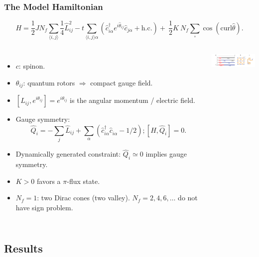 \documentclass[xcolor=table, 10pt, aspectratio=43]{beamer}
\begin{document}
\begin{frame}
  \frametitle{The Model Hamiltonian}
  \[
  H=\frac{1}{2}JN_{f}\sum_{\langle i,j \rangle} \frac 1 4 \hat{L}^{2}_{ij}-t\sum_{\langle i,j \rangle\alpha}\left(\hat{c}^{\dagger}_{i\alpha}e^{i\hat{\theta}_{ij}}\hat{c}_{j\alpha}+\text{h.c.}\right)
  +\ \frac{1}{2}K\ N_f\sum_{\square}\cos \left( \text{curl} \hat{\theta} \right).
\]
\begin{columns}
  \begin{itemize}
    \item $c$: spinon.
    \item $\theta_{ij}$: quantum rotors $\Rightarrow$ compact gauge field.
    \item $[L_{ij}, e^{i\theta_{ij}}]=e^{i\theta_{ij}}$ is the angular momentum / electric field.
    \item Gauge symmetry:
    \[\hat{Q}_{i} = -\sum_{j}\hat{L}_{ij} + \sum_{\alpha} \left( \hat{c}^{\dagger}_{i\alpha}\hat{c}^{\phantom\dagger}_{i\alpha} - 1/2 \right);[H, \hat Q_i] = 0.\]
    \item Dynamically generated constraint:
		$\hat Q_i \simeq 0$ implies gauge symmetry.
    \item $K>0$ favors a $\pi$-flux state.
		\item $N_f=1$: two Dirac cones (two valley). $N_f=2,4,6,\ldots$ do not have sign problem.
  \end{itemize}

  \begin{center}
    \includegraphics[width=3cm]{../u1sl/model}
  \end{center}
\end{columns}
\end{frame}

\subsection{Results}
\end{document}
